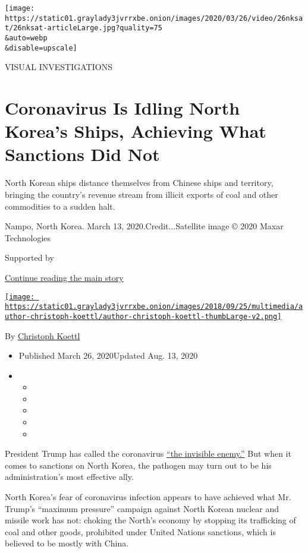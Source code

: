 \texttt{[image: https://static01.graylady3jvrrxbe.onion/images/2020/03/26/video/26nksat/26nksat-articleLarge.jpg?quality=75\\\&auto=webp\\\&disable=upscale]}

VISUAL INVESTIGATIONS

\hypertarget{coronavirus-is-idling-north-koreas-ships-achieving-what-sanctions-did-not}{%
\section{Coronavirus Is Idling North Korea's Ships, Achieving What
Sanctions Did
Not}\label{coronavirus-is-idling-north-koreas-ships-achieving-what-sanctions-did-not}}

North Korean ships distance themselves from Chinese ships and territory,
bringing the country's revenue stream from illicit exports of coal and
other commodities to a sudden halt.

Nampo, North Korea. March 13, 2020.Credit...Satellite image © 2020 Maxar
Technologies

Supported by

\protect\hyperlink{after-sponsor}{Continue reading the main story}

\href{https://www.nytimes3xbfgragh.onion/by/christoph-koettl}{\texttt{[image: https://static01.graylady3jvrrxbe.onion/images/2018/09/25/multimedia/author-christoph-koettl/author-christoph-koettl-thumbLarge-v2.png]}}

By
\href{https://www.nytimes3xbfgragh.onion/by/christoph-koettl}{Christoph
Koettl}

\begin{itemize}
\item
  Published March 26, 2020Updated Aug. 13, 2020
\item
  \begin{itemize}
  \item
  \item
  \item
  \item
  \item
  \end{itemize}
\end{itemize}

President Trump has called the coronavirus
\href{https://www.nytimes3xbfgragh.onion/2020/03/18/us/politics/donald-trump-coronavirus-trump-stimulus.html}{``the
invisible enemy.''} But when it comes to sanctions on North Korea, the
pathogen may turn out to be his administration's most effective ally.

North Korea's fear of coronavirus infection appears to have achieved
what Mr. Trump's ``maximum pressure'' campaign against North Korean
nuclear and missile work has not: choking the North's economy by
stopping its trafficking of coal and other goods, prohibited under
United Nations sanctions, which is believed to be mostly with China.

